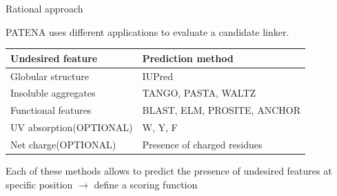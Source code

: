 \documentclass{beamer}
\begin{document}

% 

\begin{frame}{Rational approach}
 
PATENA uses different applications to evaluate a candidate linker.
\vspace{15px}

\begin{tabular}{l|l}
\textbf{Undesired feature} & \textbf{Prediction method} \\ \hline \hline
\rowcolor{Gray} Globular structure & IUPred  \\
Insoluble aggregates & TANGO, PASTA, WALTZ   \\
\rowcolor{Gray}Functional features & BLAST, ELM, PROSITE, ANCHOR \\  
UV absorption(OPTIONAL) & W, Y, F \\ %
\rowcolor{Gray}Net charge(OPTIONAL)& Presence of charged residues\\
\end{tabular}
 

\vspace{20px} 
Each of these methods allows to predict the presence of undesired features at specific position $\rightarrow$ define a scoring function
\end{frame}








\end{document}
